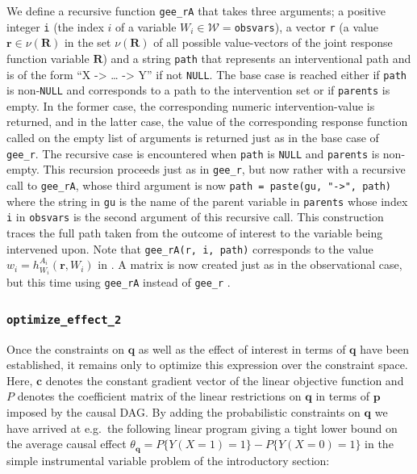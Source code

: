 We define a recursive function \texttt{gee\_rA} that takes three arguments; a positive integer \texttt{i} (the index \(i\) of a variable \(W_i\in\mathcal{W}=\)\texttt{obsvars}), a vector \texttt{r} (a value \(\mathbf{r}\in\nu(\mathbf{R})\) in the set \(\nu(\mathbf{R})\) of all possible value-vectors of the joint response function variable \(\mathbf{R}\)) and a string \texttt{path} that represents an interventional path and is of the form ``X -\textgreater{} \ldots{} -\textgreater{} Y'' if not \texttt{NULL}. The base case is reached either if \texttt{path} is non-\texttt{NULL} and corresponds to a path to the intervention set or if \texttt{parents} is empty.
In the former case, the corresponding numeric intervention-value is returned, and in the latter case, the value of the corresponding response function called on the empty list of arguments is returned just as in the base case of \texttt{gee\_r}.
The recursive case is encountered when \texttt{path} is \texttt{NULL} and \texttt{parents} is non-empty.
This recursion proceeds just as in \texttt{gee\_r}, but now rather with a recursive call to \texttt{gee\_rA}, whose third argument is now \texttt{path\ =\ paste(gu,\ "-\textgreater{}",\ path)} where the string in \texttt{gu} is the name of the parent variable in \texttt{parents} whose index \texttt{i} in \texttt{obsvars} is the second argument of this recursive call. This construction traces the full path taken from the outcome of interest to the variable being intervened upon. Note that \texttt{gee\_rA(r,\ i,\ path)} corresponds to the value \(w_i=h^{A_i}_{W_i}(\mathbf{r},W_i)\) in \citet{generalcausalbounds}.
A matrix is now created just as in the observational case, but this time using \texttt{gee\_rA} instead of \texttt{gee\_r} .

\hypertarget{optimize_effect_2}{%
\subsubsection{\texorpdfstring{\texttt{optimize\_effect\_2}}{optimize\_effect\_2}}\label{optimize_effect_2}}

Once the constraints on \(\mathbf{q}\) as well as the effect of interest in terms of \(\mathbf{q}\) have been established, it remains only to optimize this expression over the constraint space. Here, \(\mathbf{c}\) denotes the constant gradient vector of the linear objective function and \(P\) denotes the coefficient matrix of the linear restrictions on \(\mathbf{q}\) in terms of \(\mathbf{p}\) imposed by the causal DAG. By adding the probabilistic constraints on \(\mathbf{q}\) we have arrived at e.g.~the following linear program giving a tight lower bound on the average causal effect \(\theta_\mathbf{q} = P\{Y(X = 1) = 1\} - P\{Y(X = 0) = 1\}\) in the simple instrumental variable problem of the introductory section:


